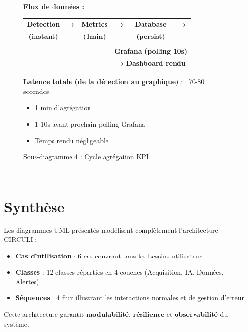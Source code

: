 \begin{figure}[H]
{\begin{minipage}{0.95\textwidth}
    \vspace{0.3cm}
    
    \textbf{Flux de données :}
    
    \begin{center}
    \begin{tabular}{|c|c|c|c|c|c|}
    \hline
    \textbf{Detection} & \textbf{→} & \textbf{Metrics} & \textbf{→} & \textbf{Database} & \textbf{→} \\
    \textbf{(instant)} & & \textbf{(1min)} & & \textbf{(persist)} & \\
    \hline
    \multicolumn{3}{|c|}{} & \multicolumn{3}{|c|}{} \\
    \multicolumn{3}{|c|}{} & \multicolumn{3}{|c|}{\textbf{Grafana (polling 10s)}} \\
    \multicolumn{3}{|c|}{} & \multicolumn{3}{|c|}{\textbf{→ Dashboard rendu}} \\
    \hline
    \end{tabular}
    \end{center}
    
    \vspace{0.3cm}
    
    \textbf{Latence totale (de la détection au graphique)} : ~70-80 secondes
    \begin{itemize}
        \item 1 min d'agrégation
        \item 1-10s avant prochain polling Grafana
        \item Temps rendu négligeable
    \end{itemize}
    
    \end{minipage}}
    \caption{Sous-diagramme 4 : Cycle agrégation KPI}
    \label{fig:seq-kpi-cycle}
\end{figure}

---

\section{Synthèse}

Les diagrammes UML présentés modélisent complètement l'architecture CIRCULI :

\begin{itemize}
    \item \textbf{Cas d'utilisation} : 6 cas couvrant tous les besoins utilisateur
    \item \textbf{Classes} : 12 classes réparties en 4 couches (Acquisition, IA, Données, Alertes)
    \item \textbf{Séquences} : 4 flux illustrant les interactions normales et de gestion d'erreur
\end{itemize}

Cette architecture garantit \textbf{modulabilité}, \textbf{résilience} et \textbf{observabilité} du système.

